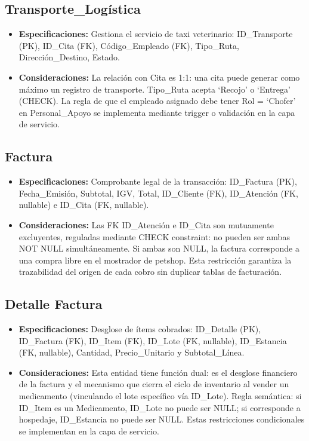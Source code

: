 \subsection{Transporte\_Logística}

\begin{itemize}
	\item \textbf{Especificaciones:} Gestiona el servicio de taxi veterinario: ID\_Transporte (PK), ID\_Cita (FK), Código\_Empleado (FK), Tipo\_Ruta, Dirección\_Destino, Estado.
	\item \textbf{Consideraciones:} La relación con Cita es 1:1: una cita puede generar como máximo un registro de transporte. Tipo\_Ruta acepta `Recojo' o `Entrega' (CHECK). La regla de que el empleado asignado debe tener Rol = `Chofer' en Personal\_Apoyo se implementa mediante trigger o validación en la capa de servicio.
\end{itemize}

\subsection{Factura}

\begin{itemize}
	\item \textbf{Especificaciones:} Comprobante legal de la transacción: ID\_Factura (PK), Fecha\_Emisión, Subtotal, IGV, Total, ID\_Cliente (FK), ID\_Atención (FK, nullable) e ID\_Cita (FK, nullable).
	\item \textbf{Consideraciones:} Las FK ID\_Atención e ID\_Cita son mutuamente excluyentes, reguladas mediante CHECK constraint: no pueden ser ambas NOT NULL simultáneamente. Si ambas son NULL, la factura corresponde a una compra libre en el mostrador de petshop. Esta restricción garantiza la trazabilidad del origen de cada cobro sin duplicar tablas de facturación.
\end{itemize}

\subsection{Detalle Factura}

\begin{itemize}
	\item \textbf{Especificaciones:} Desglose de ítems cobrados: ID\_Detalle (PK), ID\_Factura (FK), ID\_Item (FK), ID\_Lote (FK, nullable), ID\_Estancia (FK, nullable), Cantidad, Precio\_Unitario y Subtotal\_Línea.
	\item \textbf{Consideraciones:} Esta entidad tiene función dual: es el desglose financiero de la factura y el mecanismo que cierra el ciclo de inventario al vender un medicamento (vinculando el lote específico vía ID\_Lote). Regla semántica: si ID\_Item es un Medicamento, ID\_Lote no puede ser NULL; si corresponde a hospedaje, ID\_Estancia no puede ser NULL. Estas restricciones condicionales se implementan en la capa de servicio.
\end{itemize}

